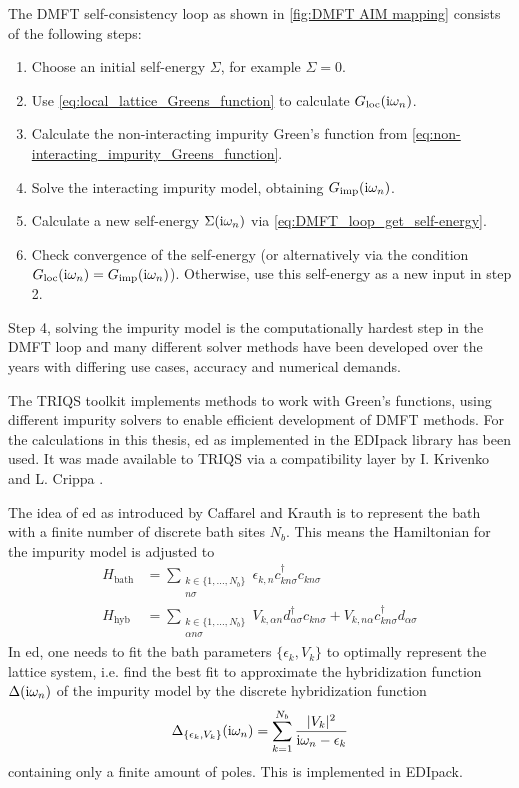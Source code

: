 \documentclass[../main.tex]{subfiles}
\begin{document}
The DMFT self-consistency loop as shown in \cref{fig:DMFT AIM mapping} consists of the following steps:
\begin{enumerate}
	\item Choose an initial self-energy \(\Sigma\), for example \(\Sigma = 0\).
	\item Use \cref{eq:local_lattice_Greens_function} to calculate \(G_{\mathrm{loc}} (\mathrm{i} \omega_n)\).
	\item Calculate the non-interacting impurity Green's function from \cref{eq:non-interacting_impurity_Greens_function}.
	\item Solve the interacting impurity model, obtaining \(G_{\mathrm{imp}} (\mathrm{i} \omega_n)\).
	\item Calculate a new self-energy \(\Sigma (\mathrm{i} \omega_n)\) via \cref{eq:DMFT_loop_get_self-energy}.
	\item Check convergence of the self-energy (or alternatively via the condition \(G_{\mathrm{loc}} (\mathrm{i} \omega_n) = G_{\mathrm{imp}} (\mathrm{i} \omega_n)\)). Otherwise, use this self-energy as a new input in step 2.
\end{enumerate}
Step 4, solving the impurity model is the computationally hardest step in the DMFT loop and many different solver methods have been developed over the years with differing use cases, accuracy and numerical demands.

The TRIQS toolkit \cite{parcolletTRIQSToolboxResearch2015} implements methods to work with Green's functions, using different impurity solvers to enable efficient development of DMFT methods.
For the calculations in this thesis, \gls{ed} as implemented in the EDIpack library \cite{amaricciEDIpackParallelExact2022} has been used.
It was made available to TRIQS via a compatibility layer by I. Krivenko and L. Crippa \cite{krivenkoKrivenkoEdipack2triqs2025}.

The idea of \gls{ed} as introduced by Caffarel and Krauth \cite{caffarelExactDiagonalizationApproach1994} is to represent the bath with a finite number of discrete bath sites \(N_b\).
This means the Hamiltonian for the impurity model is adjusted to
\begin{align}
	H_{\mathrm{bath}} &= \sum_{\substack{k \in \{1, \ldots, N_b\} \\ n \sigma}} \epsilon_{k, n} c_{k n \sigma}^{\dagger} c_{k n \sigma}  \\
	H_{\mathrm{hyb}} &= \sum_{\substack{k \in \{1, \ldots, N_b\} \\ \alpha n \sigma}} V_{k, \alpha n} d_{\alpha \sigma}^{\dagger} c_{k n \sigma} + V_{k, n \alpha} c_{k n \sigma}^{\dagger} d_{\alpha \sigma}
\end{align}
In \gls{ed}, one needs to fit the bath parameters \(\{\epsilon_k, V_k\}\) to optimally represent the lattice system, i.e. find the best fit to approximate the hybridization function \(\Delta (\mathrm{i} \omega_n)\) of the impurity model by the discrete hybridization function
\begin{equation}
	\Delta_{\{\epsilon_k, V_k\}} (\mathrm{i} \omega_n) = \sum_{k=1}^{N_b} \frac{\vert V_k \vert^2}{\mathrm{i} \omega_n - \epsilon_k}
\end{equation}
containing only a finite amount of poles.
This is implemented in EDIpack.
\end{document}
